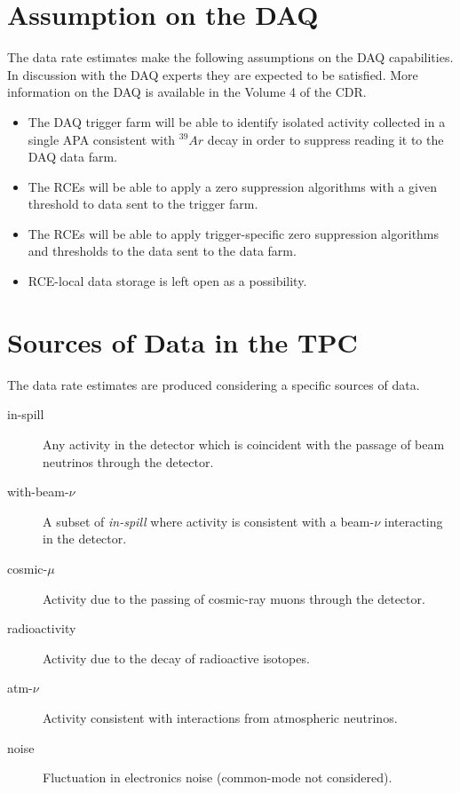 \section{Assumption on the DAQ}

The data rate estimates make the following assumptions on the DAQ capabilities.
In discussion with the DAQ experts they are expected to be satisfied.
More information on the DAQ is available in the Volume 4 of the CDR.

\begin{itemize}
\item The DAQ trigger farm will be able to identify isolated activity
  collected in a single APA consistent with $^{39}Ar$ decay in order
  to suppress reading it to the DAQ data farm.
\item The RCEs will be able to apply a zero suppression
  algorithms with a given threshold to data sent to the trigger farm.
\item The RCEs will be able to apply trigger-specific zero suppression
  algorithms and thresholds to the data sent to the data farm.
\item RCE-local data storage is left open as a possibility.
\end{itemize}

\section{Sources of Data in the TPC}

The data rate estimates are produced considering a specific sources of
data.

\begin{description}
\item[in-spill] Any activity in the detector which is coincident with
  the passage of beam neutrinos through the detector.
\item[with-beam-$\nu$] A subset of \textit{in-spill} where activity is
  consistent with a beam-$\nu$ interacting in the detector.
\item[cosmic-$\mu$] Activity due to the passing of cosmic-ray muons
  through the detector.
\item[radioactivity] Activity due to the decay of radioactive
  isotopes.
\item[atm-$\nu$] Activity consistent with interactions from
  atmospheric neutrinos.
\item[noise] Fluctuation in electronics noise (common-mode not considered).
\end{description}

